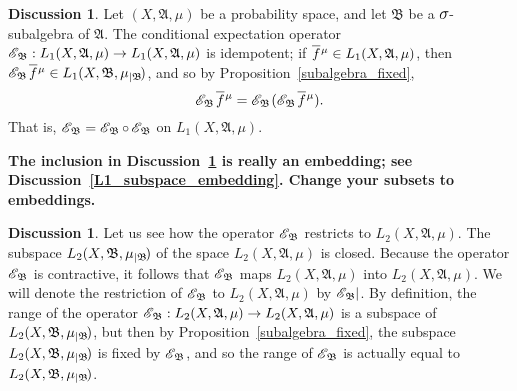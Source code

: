 \documentclass[
twoside=true,
paper=letter,
fontsize=9pt,
pagesize=auto,
leqno,
openany,
headsepline,
overfullrule,
]{scrbook}
\theoremstyle{plain}
\theoremstyle{plain}
\theoremstyle{definition}
\newtheorem{discussion}[thm]{Discussion}
\theoremstyle{bfnoteitalic}
\theoremstyle{bfnoteroman}
\newcommand{\sigalg}[1]{\mathfrak{#1}}
\newcommand{\cali}[1]{\mathscr{#1}}
\newcommand{\condexpsub}[2]
{\mathop{\cali{E}\hspace{-1.5pt}}\nolimits_{#2}\hspace{-1pt}#1}
\newcommand{\condexpop}[1]{\mathop{\cali{E}\hspace{-1pt}}\nolimits_{#1}}
\newcommand{\textsigma}{\hbox{\large{$\sigma$}}\kern-1pt}
\newcommand{\restrictedto}[1]{_{\lvert#1}\kern-1.5pt}
\newcommand{\sigmaalgebra}{\sigalg{A}}
\newcommand{\sigmaalgebraii}{\sigalg{B}}
\newcommand{\function}{f}
\newcommand{\measurespace}{X}
\newcommand{\measure}{\mu}
\newcommand*\xbar[1]{%
   \hbox{%
     \vbox{%
       \hrule height 0.4pt %
       \kern0.4ex%
       \hbox{%
         \ensuremath{#1}%
       }%
     }%
   }%
}
\newcommand{\lebclass}[1]{\hspace{.5pt}\xbar{#1}\hspace{0.5pt}}
\newcommand{\ellclass}[2]{\lebclass{#1}^{#2}}
\begin{document}
%
\begin{discussion}
Let $(\measurespace, \sigmaalgebra,\measure)$ be a  probability space, and let 
$\sigmaalgebraii$ be a $\textsigma$-subalgebra of $\sigmaalgebra$.
The conditional expectation operator
$
\condexpop{\sigmaalgebraii}:
L_1 (\measurespace, \sigmaalgebra,\measure)\to
L_1 (\measurespace, \sigmaalgebra,\measure)
$
is idempotent; if $\ellclass{\function}{\measure}\in L_1(\measurespace, \sigmaalgebra,\measure)$, then $\condexpsub{\ellclass{\function}{\measure}}{\sigmaalgebraii}\in 
L_1(\measurespace, \sigmaalgebraii,\measure\restrictedto{\sigmaalgebraii})$, and so by Proposition~\ref{subalgebra_fixed}, 
\[
\condexpsub{\ellclass{\function}{\measure}}{\sigmaalgebraii}
=
\condexpsub{{(\condexpsub{\ellclass{\function}{\measure}}{\sigmaalgebraii}})}
{\sigmaalgebraii}.
\]
That is, 
$\condexpop{\sigmaalgebraii} = 
\condexpop{\sigmaalgebraii}\circ\condexpop{\sigmaalgebraii}$
on $L_1 (\measurespace, \sigmaalgebra,\measure)$.
\end{discussion}

\textbf{The inclusion in Discussion~\ref{not_a_subspace} is really an embedding;
see Discussion~\ref{L1_subspace_embedding}.
Change your subsets to embeddings.}


\begin{discussion}\label{not_a_subspace}
Let us see how the operator
$\condexpop{\sigmaalgebraii}$ restricts to 
$L_2(\measurespace, \sigmaalgebra,\measure)$.
The subspace
$L_2(\measurespace, \sigmaalgebraii,\measure\restrictedto{\sigmaalgebraii})$
of the  space
$L_2(\measurespace, \sigmaalgebra,\measure)$ is closed.
Because the operator $\condexpop{\sigmaalgebraii}$ is contractive, it follows that 
$\condexpop{\sigmaalgebraii}$ maps
$L_2(\measurespace, \sigmaalgebra,\measure)$ 
into
$L_2(\measurespace, \sigmaalgebra,\measure)$.
We will denote the restriction of $\condexpop{\sigmaalgebraii}$ to 
$L_2(\measurespace, \sigmaalgebra,\measure)$ by 
$\condexpop{\sigmaalgebraii}\kern-2pt\vert$.
By definition, the range of the operator
$\condexpop{\sigmaalgebraii}:
L_2(\measurespace, \sigmaalgebra,\measure)
\to
L_2(\measurespace, \sigmaalgebra,\measure)$
is a subspace of 
$L_2(\measurespace, \sigmaalgebraii,\measure\restrictedto{\sigmaalgebraii})$,
but then by Proposition~\ref{subalgebra_fixed}, the subspace 
$L_2(\measurespace, \sigmaalgebraii,\measure\restrictedto{\sigmaalgebraii})$
is fixed by 
$\condexpop{\sigmaalgebraii}$, and so the range of 
$\condexpop{\sigmaalgebraii}$
is actually equal to 
$L_2(\measurespace, \sigmaalgebraii,\measure\restrictedto{\sigmaalgebraii})$.
\end{discussion}
\end{document}
